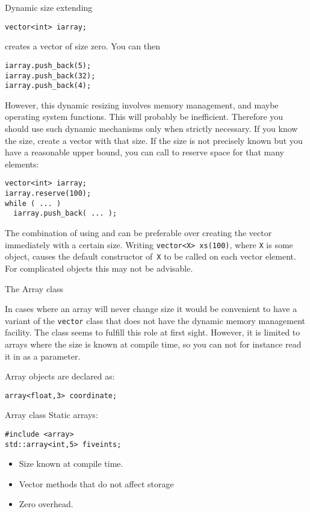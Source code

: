 \begin{block}{Dynamic size extending}
  \label{sl:vector-extend}
\begin{lstlisting}
vector<int> iarray;
\end{lstlisting}
creates a vector of size zero. You can then
\begin{lstlisting}
iarray.push_back(5);
iarray.push_back(32);
iarray.push_back(4);
\end{lstlisting}
\end{block}

However, this dynamic resizing involves memory management, and maybe
operating system functions. This will probably be
inefficient. Therefore you should use such dynamic mechanisms only
when strictly necessary.
If you know the size,
create a vector with that size. If the size is not precisely known but
you have a reasonable upper bound, you can call  to
reserve space for that many elements:
\begin{lstlisting}
vector<int> iarray;
iarray.reserve(100);
while ( ... )
  iarray.push_back( ... );
\end{lstlisting}

The combination of using  and 
can be preferable over creating the vector immediately with a certain size.
Writing \lstinline+vector<X> xs(100)+, where \lstinline{X} is some object,
causes the default constructor of~\lstinline{X} to be called on each vector element.
For complicated objects this may not be advisable.

 {The Array class}
\label{sec:cpp-array}
\label{sec:stdarray}

In cases where an array will never change size it would be convenient
to have a variant of the \lstinline{vector} class that does not have
the dynamic memory management facility.
The  class seems to fulfill this role at first sight.
However, it
is limited to arrays where the size is known at compile time,
so you can not for instance read it in as a parameter.


Array objects are declared as:
\begin{lstlisting}
array<float,3> coordinate;
\end{lstlisting}


\begin{slide}{Array class}
\label{sl:array-class}
Static arrays:
\begin{lstlisting}
#include <array>
std::array<int,5> fiveints;
\end{lstlisting}
\begin{itemize}
\item Size known at compile time.
\item Vector methods that do not affect storage
\item Zero overhead.
\end{itemize}
\end{slide}

